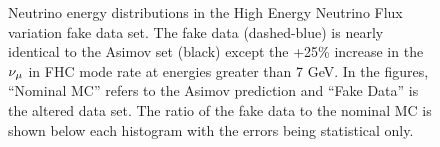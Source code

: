 \begin{figure}
\begin{centering}
{\begin{centering}
\par\end{centering}
}
\par\end{centering}
\caption[Neutrino Energy Distributions in the High Energy Neutrino Flux Variation
Fake Data Set]{Neutrino energy distributions in the High Energy Neutrino Flux variation
fake data set. The fake data (dashed-blue) is nearly identical to
the Asimov set (black) except the +25\% increase in the $\protect\nu_{\mu}$
in FHC mode rate at energies greater than 7 GeV. In the figures, ``Nominal
MC'' refers to the Asimov prediction and ``Fake Data'' is the altered
data set. The ratio of the fake data to the nominal MC is shown below
each histogram with the errors being statistical only.\label{fig:Neutrino-flux-fake-data-set}}
\end{figure}
